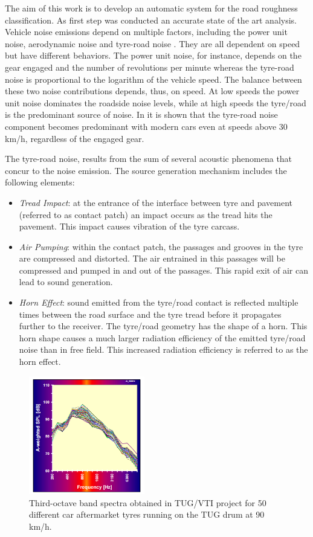 The aim of this work is to develop an automatic system for the road roughness classification. As first step was conducted an accurate state of the art analysis.	
Vehicle noise emissions depend on multiple factors, including the power unit noise, aerodynamic noise and tyre-road noise \cite{hanson2004tire}. They are all dependent on speed but have different behaviors. The power unit noise, for instance, depends on the gear engaged and the number of revolutions per minute whereas the tyre-road noise is proportional to the logarithm of the vehicle speed. The balance between these two noise contributions depends, thus, on speed. 
At low speeds the power unit noise dominates the roadside noise levels, while at high speeds the tyre/road is the predominant source of noise. In \cite{sandberg2001tyre} it is shown that  the tyre-road noise component becomes predominant with modern cars even at speeds above 30 km/h, regardless of the engaged gear. 

The tyre-road noise, results from the sum of several acoustic phenomena that concur to the noise emission. The source generation mechanism includes the following elements: 
\begin{itemize}
	\item  \textit{Tread Impact}: at the entrance of the interface between tyre and pavement (referred to as contact patch) an impact occurs as the tread hits the pavement. This impact causes vibration of the tyre carcass. 
	\item \textit{Air Pumping}: within the contact patch, the passages and grooves in the tyre are compressed and distorted. The air entrained in this passages will be compressed and pumped in and out of the passages. This  rapid exit of air can lead to sound generation.
	\item \textit{Horn Effect}: sound emitted from the tyre/road contact is reflected multiple times between the road surface and the tyre tread before it propagates further to the receiver. The tyre/road geometry has the shape of a horn. This horn shape causes a much larger radiation efficiency of the emitted tyre/road noise than in free field. This increased radiation efficiency is referred to as the horn effect. 
\end{itemize}	

\begin{figure}[h]
	\centering
	\centerline{\includegraphics[width=0.45\textwidth]{img/tire.png}}
	\caption[Third-octave band noise spectra]{Third-octave band spectra obtained in TUG/VTI project for 50 different car aftermarket tyres running on the TUG drum at 90 km/h.}
	\label{fig:noise-spec}
\end{figure} 

